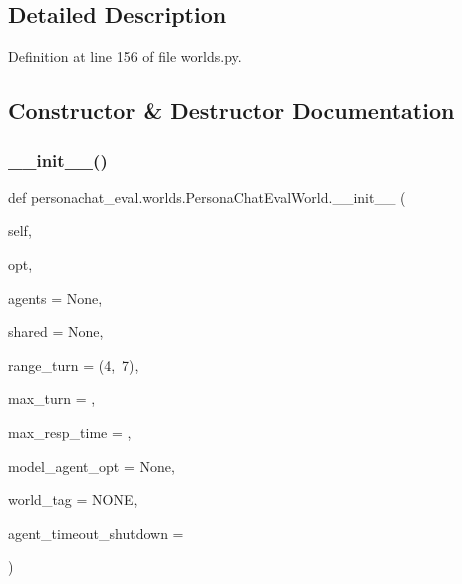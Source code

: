 \subsection{Detailed Description}


Definition at line 156 of file worlds.\+py.



\subsection{Constructor \& Destructor Documentation}
\mbox{\label{classpersonachat__eval_1_1worlds_1_1PersonaChatEvalWorld_a84445a3daf6d694a74e90e3ca0ba65dd}} 
\subsubsection{\texorpdfstring{\+\_\+\+\_\+init\+\_\+\+\_\+()}{\_\_init\_\_()}}
{\footnotesize\ttfamily def personachat\+\_\+eval.\+worlds.\+Persona\+Chat\+Eval\+World.\+\_\+\+\_\+init\+\_\+\+\_\+ (\begin{DoxyParamCaption}\item[{}]{self,  }\item[{}]{opt,  }\item[{}]{agents = {\ttfamily None},  }\item[{}]{shared = {\ttfamily None},  }\item[{}]{range\+\_\+turn = {\ttfamily (4,~7)},  }\item[{}]{max\+\_\+turn = {},  }\item[{}]{max\+\_\+resp\+\_\+time = {},  }\item[{}]{model\+\_\+agent\+\_\+opt = {\ttfamily None},  }\item[{}]{world\+\_\+tag = {\ttfamily \textquotesingle{}NONE\textquotesingle{}},  }\item[{}]{agent\+\_\+timeout\+\_\+shutdown = {} }\end{DoxyParamCaption})}




